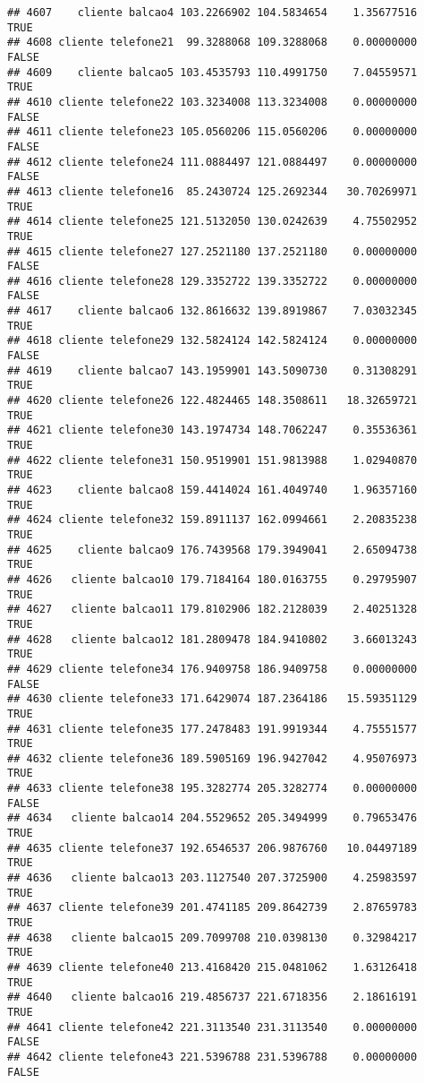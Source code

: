 \documentclass[
]{article}
\begin{document}
\begin{verbatim}
## 4607    cliente balcao4 103.2266902 104.5834654    1.35677516     TRUE
## 4608 cliente telefone21  99.3288068 109.3288068    0.00000000    FALSE
## 4609    cliente balcao5 103.4535793 110.4991750    7.04559571     TRUE
## 4610 cliente telefone22 103.3234008 113.3234008    0.00000000    FALSE
## 4611 cliente telefone23 105.0560206 115.0560206    0.00000000    FALSE
## 4612 cliente telefone24 111.0884497 121.0884497    0.00000000    FALSE
## 4613 cliente telefone16  85.2430724 125.2692344   30.70269971     TRUE
## 4614 cliente telefone25 121.5132050 130.0242639    4.75502952     TRUE
## 4615 cliente telefone27 127.2521180 137.2521180    0.00000000    FALSE
## 4616 cliente telefone28 129.3352722 139.3352722    0.00000000    FALSE
## 4617    cliente balcao6 132.8616632 139.8919867    7.03032345     TRUE
## 4618 cliente telefone29 132.5824124 142.5824124    0.00000000    FALSE
## 4619    cliente balcao7 143.1959901 143.5090730    0.31308291     TRUE
## 4620 cliente telefone26 122.4824465 148.3508611   18.32659721     TRUE
## 4621 cliente telefone30 143.1974734 148.7062247    0.35536361     TRUE
## 4622 cliente telefone31 150.9519901 151.9813988    1.02940870     TRUE
## 4623    cliente balcao8 159.4414024 161.4049740    1.96357160     TRUE
## 4624 cliente telefone32 159.8911137 162.0994661    2.20835238     TRUE
## 4625    cliente balcao9 176.7439568 179.3949041    2.65094738     TRUE
## 4626   cliente balcao10 179.7184164 180.0163755    0.29795907     TRUE
## 4627   cliente balcao11 179.8102906 182.2128039    2.40251328     TRUE
## 4628   cliente balcao12 181.2809478 184.9410802    3.66013243     TRUE
## 4629 cliente telefone34 176.9409758 186.9409758    0.00000000    FALSE
## 4630 cliente telefone33 171.6429074 187.2364186   15.59351129     TRUE
## 4631 cliente telefone35 177.2478483 191.9919344    4.75551577     TRUE
## 4632 cliente telefone36 189.5905169 196.9427042    4.95076973     TRUE
## 4633 cliente telefone38 195.3282774 205.3282774    0.00000000    FALSE
## 4634   cliente balcao14 204.5529652 205.3494999    0.79653476     TRUE
## 4635 cliente telefone37 192.6546537 206.9876760   10.04497189     TRUE
## 4636   cliente balcao13 203.1127540 207.3725900    4.25983597     TRUE
## 4637 cliente telefone39 201.4741185 209.8642739    2.87659783     TRUE
## 4638   cliente balcao15 209.7099708 210.0398130    0.32984217     TRUE
## 4639 cliente telefone40 213.4168420 215.0481062    1.63126418     TRUE
## 4640   cliente balcao16 219.4856737 221.6718356    2.18616191     TRUE
## 4641 cliente telefone42 221.3113540 231.3113540    0.00000000    FALSE
## 4642 cliente telefone43 221.5396788 231.5396788    0.00000000    FALSE

\end{verbatim}
\end{document}

